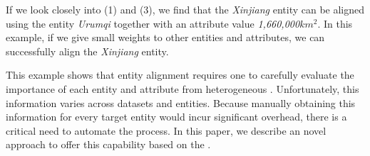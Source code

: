 If we look closely into \KGs (1) and (3), we find that the \emph{Xinjiang} entity can be aligned using the entity \emph{Urumqi} together
with an attribute value \emph{1,660,000$km^2$}. In this example, if we give small weights to other entities and attributes, we can
successfully align the \emph{Xinjiang} entity.

This example shows that entity alignment requires one to carefully evaluate the importance of each entity and attribute from heterogeneous
\KGs. Unfortunately, this information varies across datasets and entities. Because manually obtaining this information for every target
entity would incur significant overhead, there is a critical need to automate the process. In this paper, we describe an novel approach to
offer this capability based on the \RGCN.
